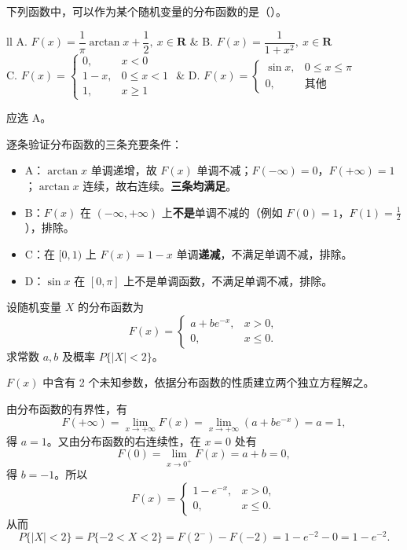 \documentclass[lang=cn,11pt]{elegantbook}
\begin{document}
\begin{exercise}\label{exer:2-2}
下列函数中，可以作为某个随机变量的分布函数的是（\quad）。\par
\begin{tabular}{ll}
A. \(F(x) = \dfrac{1}{\pi}\arctan x + \dfrac{1}{2},\ x \in \mathbf{R}\) & B. \(F(x) = \dfrac{1}{1+x^2},\ x \in \mathbf{R}\) \\[6pt]
C. \(F(x) = \begin{cases} 0, & x < 0 \\ 1-x, & 0 \le x < 1 \\ 1, & x \ge 1 \end{cases}\) & D. \(F(x) = \begin{cases} \sin x, & 0 \le x \le \pi \\ 0, & \text{其他} \end{cases}\)
\end{tabular}
\end{exercise}

\begin{solution}
应选 A。

逐条验证分布函数的三条充要条件：
\begin{itemize}
    \item A：\(\arctan x\) 单调递增，故 \(F(x)\) 单调不减；\(F(-\infty)=0\)，\(F(+\infty)=1\)；\(\arctan x\) 连续，故右连续。\textbf{三条均满足}。
    \item B：\(F(x)\) 在 \((-\infty,+\infty)\) 上\textbf{不是}单调不减的（例如 \(F(0)=1\)，\(F(1)=\frac{1}{2}\)），排除。
    \item C：在 \([0,1)\) 上 \(F(x)=1-x\) 单调\textbf{递减}，不满足单调不减，排除。
    \item D：\(\sin x\) 在 \([0,\pi]\) 上不是单调函数，不满足单调不减，排除。
\end{itemize}
\end{solution}

\begin{exercise}\label{exer:2-3}
设随机变量 \(X\) 的分布函数为
\[
F(x) = \begin{cases}
a + b e^{-x}, & x > 0, \\
0, & x \le 0.
\end{cases}
\]
求常数 \(a, b\) 及概率 \(P\{|X| < 2\}\)。
\end{exercise}

\begin{solution}
\(F(x)\) 中含有 2 个未知参数，依据分布函数的性质建立两个独立方程解之。

由分布函数的有界性，有
\[
F(+\infty) = \lim_{x \to +\infty} F(x) = \lim_{x \to +\infty} (a + b e^{-x}) = a = 1,
\]
得 \(a = 1\)。又由分布函数的右连续性，在 \(x=0\) 处有
\[
F(0) = \lim_{x \to 0^+} F(x) = a + b = 0,
\]
得 \(b = -1\)。所以
\[
F(x) = \begin{cases}
1 - e^{-x}, & x > 0, \\
0, & x \le 0.
\end{cases}
\]
从而
\[
P\{|X| < 2\} = P\{-2 < X < 2\} = F(2^-) - F(-2) = 1 - e^{-2} - 0 = 1 - e^{-2}.
\]
\end{solution}
\end{document}
